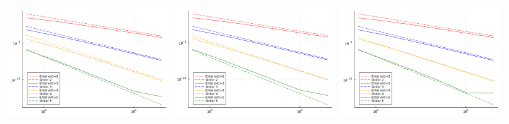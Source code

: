 \includegraphics[width=0.32\textwidth]{pdf/pdepics/numerics/DeC_errors.pdf}
\includegraphics[width=0.32\textwidth]{pdf/pdepics/numerics/sDeC_errors.pdf}
\includegraphics[width=0.32\textwidth]{pdf/pdepics/numerics/ader_errors.pdf}



